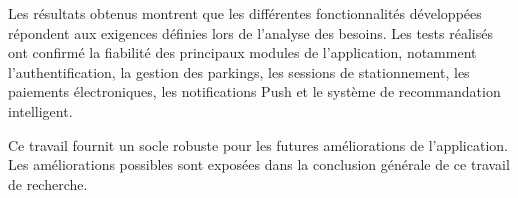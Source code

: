 \par Les résultats obtenus montrent que les différentes fonctionnalités développées répondent aux exigences définies lors de l'analyse des besoins. Les tests réalisés ont confirmé la fiabilité des principaux modules de l'application, notamment l'authentification, la gestion des parkings, les sessions de stationnement, les paiements électroniques, les notifications Push et le système de recommandation intelligent.

\par Ce travail fournit un socle robuste pour les futures améliorations de l'application. Les améliorations possibles sont exposées dans la conclusion générale de ce travail de recherche.